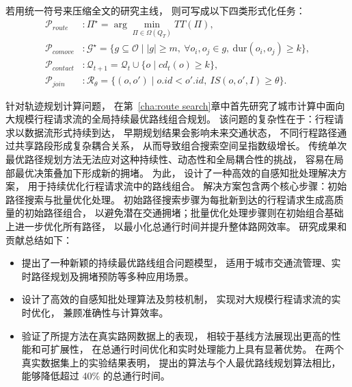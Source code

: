     若用统一符号来压缩全文的研究主线， 则可写成以下四类形式化任务：
    \begin{equation}
    \label{eq:thesis-unified-tasks}
    \begin{aligned}
    \mathcal{P}_{route} &: \Pi^\star=\arg\min_{\Pi\in\Omega(Q_T)} TT(\Pi),\\
    \mathcal{P}_{comove} &: \mathcal{G}^\star=\{g\subseteq\mathcal{O}\mid |g|\ge m,\ \forall o_i,o_j\in g,\ \mathrm{dur}(o_i,o_j)\ge k\},\\
    \mathcal{P}_{contact} &: \mathcal{Q}_{t+1}=\mathcal{Q}_{t}\cup\{o\mid cd_t(o)\ge k\},\\
    \mathcal{P}_{join} &: \mathcal{R}_\theta=\{(o,o')\mid o.id<o'.id,\ IS(o,o',I)\ge\theta\}.
    \end{aligned}
    \end{equation}



针对轨迹规划计算问题， 在第~\ref{cha:route search}章中首先研究了城市计算中面向大规模行程请求流的全局持续最优路线组合规划。 该问题的复杂性在于：行程请求以数据流形式持续到达， 早期规划结果会影响未来交通状态， 不同行程路径通过共享路段形成复杂耦合关系， 从而导致组合搜索空间呈指数级增长。 传统单次最优路径规划方法无法应对这种持续性、动态性和全局耦合性的挑战， 容易在局部最优决策叠加下形成新的拥堵。 为此， 设计了一种高效的自感知批处理解决方案， 用于持续优化行程请求流中的路线组合。 解决方案包含两个核心步骤：初始路径搜索与批量优化处理。 初始路径搜索步骤为每批新到达的行程请求生成高质量的初始路径组合， 以避免潜在交通拥堵；批量优化处理步骤则在初始组合基础上进一步优化所有路径， 以最小化总通行时间并提升整体路网效率。 研究成果和贡献总结如下：
\begin{itemize}
    \item 提出了一种新颖的持续最优路线组合问题模型， 适用于城市交通流管理、实时路径规划及拥堵预防等多种应用场景。
    \item 设计了高效的自感知批处理算法及剪枝机制， 实现对大规模行程请求流的实时优化， 兼顾准确性与计算效率。
    \item 验证了所提方法在真实路网数据上的表现， 相较于基线方法展现出更高的性能和可扩展性， 在总通行时间优化和实时处理能力上具有显著优势。 在两个真实数据集上的实验结果表明， 提出的算法与个人最优路线规划算法相比， 能够降低超过 40\% 的总通行时间。
\end{itemize}


